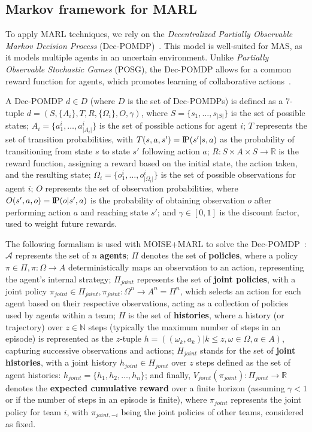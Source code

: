 \documentclass[pdflatex,sn-mathphys-num]{sn-jnl}%
\newcommand{\probP}{\text{I\kern-0.15em P}}
\theoremstyle{thmstyleone}%
\theoremstyle{thmstyletwo}%
\theoremstyle{thmstylethree}%
\begin{document}
\subsection{Markov framework for MARL}

To apply MARL techniques, we rely on the \textit{Decentralized Partially Observable Markov Decision Process} (Dec-POMDP)~\citep{Oliehoek2016}. This model is well-suited for MAS, as it models multiple agents in an uncertain environment. Unlike \textit{Partially Observable Stochastic Games} (POSG), the Dec-POMDP allows for a common reward function for agents, which promotes learning of collaborative actions~\citep{Beynier2013}.

A Dec-POMDP $d \in D$ (where $D$ is the set of Dec-POMDPs) is defined as a 7-tuple $d = (S, \{A_i\}, T, R, \{\Omega_i\}, O, \gamma)$, where $S = \{s_1,\dots,s_{|S|}\}$ is the set of possible states; $A_{i} = \{a_{1}^{i},\dots,a_{|A_{i}|}^{i}\}$ is the set of possible actions for agent $i$; $T$ represents the set of transition probabilities, with $T(s,a,s') = \probP(s'|s,a)$ as the probability of transitioning from state $s$ to state $s'$ following action $a$; $R: S \times A \times S \rightarrow \mathbb{R}$ is the reward function, assigning a reward based on the initial state, the action taken, and the resulting state; $\Omega_{i} = \{o_{1}^{i},\dots,o_{|\Omega_{i}|}^{i}\}$ is the set of possible observations for agent $i$; $O$ represents the set of observation probabilities, where $O(s',a,o) = \probP(o|s',a)$ is the probability of obtaining observation $o$ after performing action $a$ and reaching state $s'$; and $\gamma \in [0,1]$ is the discount factor, used to weight future rewards.


The following formalism is used with MOISE+MARL to solve the Dec-POMDP~\citep{Beynier2013,Albrecht2024}: $\mathcal{A}$ represents the set of $n$ \textbf{agents}; $\Pi$ denotes the set of \textbf{policies}, where a policy $\pi \in \Pi, \pi: \Omega \rightarrow A$ deterministically maps an observation to an action, representing the agent's internal strategy; $\Pi_{joint}$ represents the set of \textbf{joint policies}, with a joint policy $\pi_{joint} \in \Pi_{joint}, \pi_{joint}: \Omega^n \rightarrow A^n = \Pi^n$, which selects an action for each agent based on their respective observations, acting as a collection of policies used by agents within a team; $H$ is the set of \textbf{histories}, where a history (or trajectory) over $z \in \mathbb{N}$ steps (typically the maximum number of steps in an episode) is represented as the $z$-tuple $h = ((\omega_{k}, a_{k}) | k \leq z, \omega \in \Omega, a \in A)$, capturing successive observations and actions; $H_{joint}$ stands for the set of \textbf{joint histories}, with a joint history $h_{joint} \in H_{joint}$ over $z$ steps defined as the set of agent histories: $h_{joint} = \{h_1, h_2, \dots, h_n\}$; and finally, $V_{joint}(\pi_{joint}): \Pi_{joint} \rightarrow \mathbb{R}$ denotes the \textbf{expected cumulative reward} over a finite horizon (assuming $\gamma < 1$ or if the number of steps in an episode is finite), where $\pi_{joint}$ represents the joint policy for team $i$, with $\pi_{joint,-i}$ being the joint policies of other teams, considered as fixed.
\end{document}
